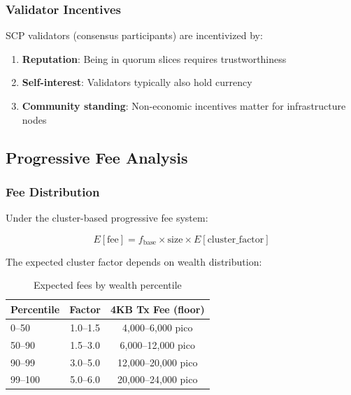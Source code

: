 \subsubsection{Validator Incentives}

SCP validators (consensus participants) are incentivized by:

\begin{enumerate}
  \item \textbf{Reputation}: Being in quorum slices requires trustworthiness
  \item \textbf{Self-interest}: Validators typically also hold currency
  \item \textbf{Community standing}: Non-economic incentives matter for
    infrastructure nodes
\end{enumerate}

\subsection{Progressive Fee Analysis}

\subsubsection{Fee Distribution}

Under the cluster-based progressive fee system:

\begin{equation}
E[\text{fee}] = f_{\text{base}} \times \text{size} \times E[\text{cluster\_factor}]
\end{equation}

The expected cluster factor depends on wealth distribution:

\begin{table}[h]
\centering
\caption{Expected fees by wealth percentile}
\label{tab:fee-percentile}
\begin{tabular}{@{}lcc@{}}
\toprule
\textbf{Percentile} & \textbf{Factor} & \textbf{4KB Tx Fee (floor)} \\
\midrule
0--50 & 1.0--1.5 & 4{,}000--6{,}000 pico \\
50--90 & 1.5--3.0 & 6{,}000--12{,}000 pico \\
90--99 & 3.0--5.0 & 12{,}000--20{,}000 pico \\
99--100 & 5.0--6.0 & 20{,}000--24{,}000 pico \\
\bottomrule
\end{tabular}
\end{table}

